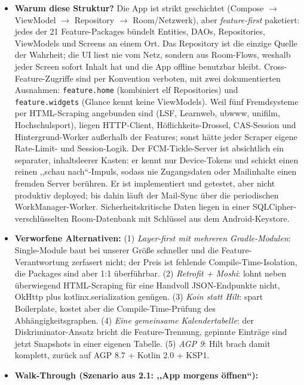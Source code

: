 \documentclass{msereport}
\begin{document}
\begin{itemize}
  \item \textbf{Warum diese Struktur?} Die App ist strikt geschichtet (Compose
        $\to$ ViewModel $\to$ Repository $\to$ Room/Netzwerk), aber
        \emph{feature-first} paketiert: jedes der 21 Feature-Packages bündelt
        Entities, DAOs, Repositories, ViewModels und Screens an einem Ort. Das
        Repository ist die einzige Quelle der Wahrheit; die UI liest nie vom
        Netz, sondern aus Room-Flows, weshalb jeder Screen sofort Inhalt hat und
        die App offline benutzbar bleibt. Cross-Feature-Zugriffe sind per
        Konvention verboten, mit zwei dokumentierten Ausnahmen:
        \texttt{feature.home} (kombiniert elf Repositories) und
        \texttt{feature.widgets} (Glance kennt keine ViewModels). Weil fünf
        Fremdsysteme per HTML-Scraping angebunden sind (LSF, Learnweb, ubwww,
        unifilm, Hochschulsport), liegen HTTP-Client, Höflichkeits-Drossel,
        CAS-Session und Hintergrund-Worker außerhalb der Features; sonst hätte
        jeder Scraper eigene Rate-Limit- und Session-Logik. Der FCM-Tickle-Server
        ist absichtlich ein separater, inhaltsleerer Kasten: er kennt nur
        Device-Tokens und schickt einen reinen ,,schau nach``-Impuls, sodass nie
        Zugangsdaten oder Mailinhalte einen fremden Server berühren. Er ist
        implementiert und getestet, aber nicht produktiv deployed; bis dahin
        läuft der Mail-Sync über die periodischen WorkManager-Worker.
        Sicherheitskritische Daten liegen in einer SQLCipher-verschlüsselten
        Room-Datenbank mit Schlüssel aus dem Android-Keystore.
  \item \textbf{Verworfene Alternativen:} (1) \emph{Layer-first mit mehreren
        Gradle-Modulen}: Single-Module baut bei unserer Größe schneller und die
        Feature-Verantwortung zerfasert nicht; der Preis ist fehlende
        Compile-Time-Isolation, die Packages sind aber 1:1 überführbar.
        (2) \emph{Retrofit + Moshi}: lohnt neben überwiegend HTML-Scraping für
        eine Handvoll JSON-Endpunkte nicht, OkHttp plus kotlinx.serialization
        genügen. (3) \emph{Koin statt Hilt}: spart Boilerplate, kostet aber die
        Compile-Time-Prüfung des Abhängigkeitsgraphen. (4) \emph{Eine gemeinsame
        Kalendertabelle}: der Diskriminator-Ansatz bricht die
        Feature-Trennung, gepinnte Einträge sind jetzt Snapshots in einer eigenen
        Tabelle. (5) \emph{AGP 9}: Hilt brach damit komplett, zurück auf
        AGP 8.7 + Kotlin 2.0 + KSP1.
  \item \textbf{Walk-Through (Szenario aus 2.1: ,,App morgens öffnen``):}

\end{itemize}
\end{document}
